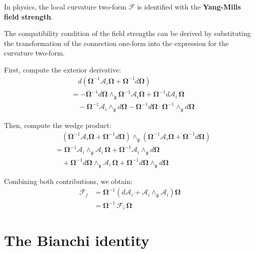 In physics, the local curvature two-form $\mathscr{F}$ is identified with the \textbf{Yang-Mills field strength}.

The compatibility condition of the field strengths can be derived by substituting the transformation  of the connection one-form into the expression for the curvature two-form.

First, compute the exterior derivative:
\begin{align*}
  &\quad d\left( \mathbf{\Omega}^{-1} \mathbf{\mathcal{A}}_i \mathbf{\Omega} + \mathbf{\Omega}^{-1} d\mathbf{\Omega} \right) \\
  &= - \mathbf{\Omega}^{-1} d\mathbf{\Omega} \wedge_{\mathfrak{g}} \mathbf{\Omega}^{-1} \mathbf{\mathcal{A}}_i \mathbf{\Omega} 
  + \mathbf{\Omega}^{-1} d\mathbf{\mathcal{A}}_i \, \mathbf{\Omega} \\
  &\quad - \mathbf{\Omega}^{-1} \mathbf{\mathcal{A}}_i \wedge_{\mathfrak{g}} d\mathbf{\Omega} 
  - \mathbf{\Omega}^{-1} d\mathbf{\Omega} \cdot \mathbf{\Omega}^{-1} \wedge_{\mathfrak{g}} d\mathbf{\Omega}
\end{align*}

Then, compute the wedge product:
\begin{align*}
  &\quad \left( \mathbf{\Omega}^{-1} \mathbf{\mathcal{A}}_i \mathbf{\Omega} + \mathbf{\Omega}^{-1} d\mathbf{\Omega} \right) 
  \wedge_{\mathfrak{g}}
  \left( \mathbf{\Omega}^{-1} \mathbf{\mathcal{A}}_i \mathbf{\Omega} + \mathbf{\Omega}^{-1} d\mathbf{\Omega} \right) \\
  &= \mathbf{\Omega}^{-1} \mathbf{\mathcal{A}}_i \wedge_{\mathfrak{g}} \mathbf{\mathcal{A}}_i \, \mathbf{\Omega} 
  + \mathbf{\Omega}^{-1} \mathbf{\mathcal{A}}_i \wedge_{\mathfrak{g}} d\mathbf{\Omega} \\
  &\quad + \mathbf{\Omega}^{-1} d\mathbf{\Omega} \wedge_{\mathfrak{g}} \mathbf{\mathcal{A}}_i \, \mathbf{\Omega} 
  + \mathbf{\Omega}^{-1} d\mathbf{\Omega} \wedge_{\mathfrak{g}} d\mathbf{\Omega}
\end{align*}

Combining both contributions, we obtain:
\begin{align*}
  \mathscr{F}_j 
  &= \mathbf{\Omega}^{-1} \left( d\mathbf{\mathcal{A}}_i + \mathbf{\mathcal{A}}_i \wedge_{\mathfrak{g}} \mathbf{\mathcal{A}}_i \right) \mathbf{\Omega} \\
  &= \mathbf{\Omega}^{-1} \, \mathscr{F}_i \, \mathbf{\Omega}
\end{align*}


\section{The Bianchi identity}

